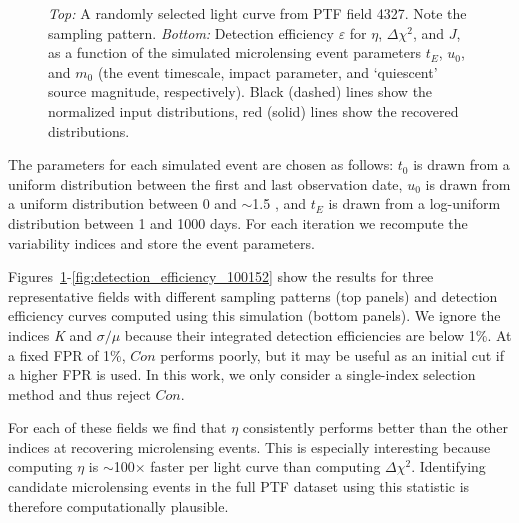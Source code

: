 \documentclass{emulateapj}
\begin{document}
\begin{figure}
\centering
	
\caption{{\it Top:} A randomly selected light curve from PTF field 4327. Note the sampling pattern. {\it Bottom:} Detection efficiency $\varepsilon$ for $\eta$, $\Delta\chi^2$, and $J$, as a function of the simulated microlensing event parameters $t_E$, $u_0$, and $m_0$ (the event timescale, impact parameter, and `quiescent' source magnitude, respectively). Black (dashed) lines show the normalized input distributions, red (solid) lines show the recovered distributions.}  \label{fig:detection_efficiency_4327}
\end{figure}

The parameters for each simulated event are chosen as follows: $t_0$ is drawn from a uniform distribution between the first and last observation date, $u_0$ is drawn from a uniform distribution between 0 and $\sim$1.5 \citep[the impact parameter that causes a maximum deviation larger than $\sim$$5\sigma$ for a $R\sim17.5$ mag source; e.g.,][]{macho_detection_efficiency}, and $t_E$ is drawn from a log-uniform distribution between 1 and 1000 days. For each iteration we recompute the variability indices and store the event parameters. 

Figures~\ref{fig:detection_efficiency_4327}-\ref{fig:detection_efficiency_100152} show the results for three representative fields with different sampling patterns (top panels) and detection efficiency curves computed using this simulation (bottom panels). We ignore the indices \textit{K} and $\sigma/\mu$ because their integrated detection efficiencies are below 1\%. At a fixed FPR of 1\%, $Con$ performs poorly, but it may be useful as an initial cut if a higher FPR is used. In this work, we only consider a single-index selection method and thus reject $Con$. 

For each of these fields we find that $\eta$ consistently performs better than the other indices at recovering microlensing events. This is especially interesting because computing $\eta$ is $\sim$100$\times$ faster per light curve than computing $\Delta\chi^2$. Identifying candidate microlensing events in the full PTF dataset using this statistic is therefore computationally plausible.
	
\end{document}
